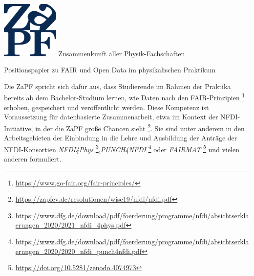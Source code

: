 \documentclass[DIV=calc]{scrartcl}
\begin{document}
  \hspace{0.87\textwidth}
  \begin{minipage}{120pt}
  	\vspace{-1.8cm}
  	\includegraphics[width=80pt]{../logo.pdf}
  	\centering
  	\small Zusammenkunft aller Physik-Fachschaften
  \end{minipage}
  \begin{center}
    \huge{Positionspapier zu FAIR und Open Data im physikalischen Praktikum}\vspace{.25\baselineskip}\\
  	\normalsize
  \end{center}
  \vspace{1cm}


Die ZaPF spricht sich dafür aus, dass Studierende im Rahmen der Praktika bereits ab dem Bachelor-Studium lernen, 
wie Daten nach den FAIR-Prinzipien \footnote{\url{https://www.go-fair.org/fair-principles/}} erhoben, gespeichert und veröffentlicht werden. 
Diese Kompetenz ist Voraussetzung für datenbasierte Zusammenarbeit, etwa im Kontext der NFDI-Initiative, in der die ZaPF große Chancen sieht \footnote{\url{https://zapfev.de/resolutionen/wise19/nfdi/nfdi.pdf}}. 
Sie sind unter anderem in den Arbeitsgebieten der Einbindung in die Lehre und Ausbildung der Anträge der NFDI-Konsortien \textit{NFDI4Phys} \footnote{\url{https://www.dfg.de/download/pdf/foerderung/programme/nfdi/absichtserklaerungen_2020/2021_nfdi_4phys.pdf}},\textit{PUNCH4NFDI} \footnote{\url{https://www.dfg.de/download/pdf/foerderung/programme/nfdi/absichtserklaerungen_2020/2020_nfdi_punch4nfdi.pdf}} oder \textit{FAIRMAT} \footnote{\url{https://doi.org/10.5281/zenodo.4074973}}
und vielen anderen formuliert. \\ 
\end{document}
